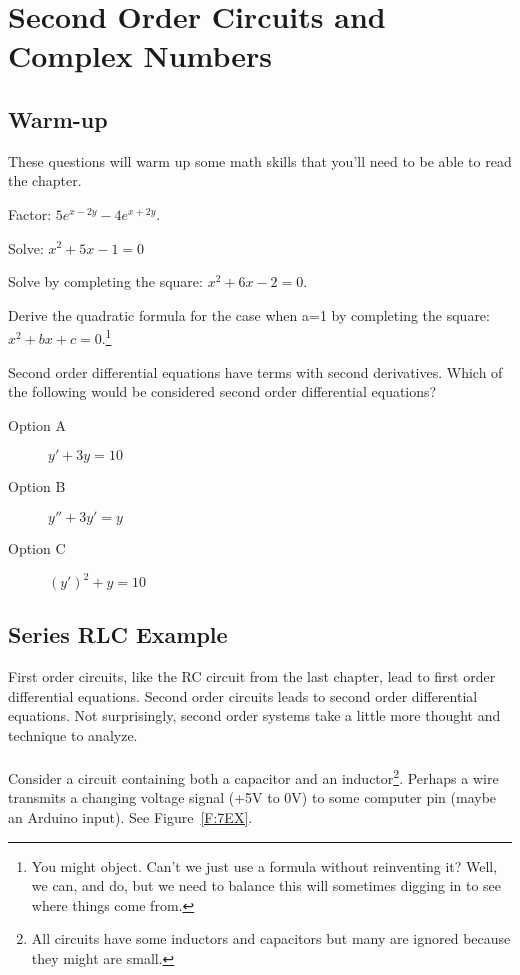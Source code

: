 \chapter{Second Order Circuits and Complex Numbers}
\section{Warm-up}
These questions will warm up some math skills that you'll need to be able to read the chapter. 
\begin{blevel}
Factor: $5e^{x-2y}-4e^{x+2y}$.
\end{blevel}

\begin{alevel}
Solve: $x^2+ 5x - 1 = 0$
\end{alevel}

\begin{blevel}
Solve by completing the square: $x^2+6x-2 = 0$.
\end{blevel}

\begin{clevel}
Derive the quadratic formula for the case when a=1 by completing the square: $x^2+bx+c = 0$.\footnote{You might object. Can't we just use a formula without reinventing it? Well, we can, and do, but we need to balance this will sometimes digging in to see where things come from.}
\end{clevel}

\begin{blevel}
Second order differential equations have terms with second derivatives. Which of the following would be considered second order differential equations?
\begin{description}
\item[Option A] $y'+3y=10$
\item[Option B] $y''+3y'=y$
\item[Option C] $(y')^2+y=10$
\end{description}
\end{blevel}

\section{Series RLC Example}
First order circuits, like the RC circuit from the last chapter, lead to first order differential equations. Second order circuits leads to second order differential equations. Not surprisingly, second order systems take a little more thought and technique to analyze. \\
\\
Consider a circuit containing both a capacitor and an inductor\footnote{All circuits have some inductors and capacitors but many are ignored because they might are small.}. Perhaps a wire transmits a changing voltage signal (+5V to 0V) to some computer pin (maybe an Arduino input). See Figure~\ref{F:7EX}.

